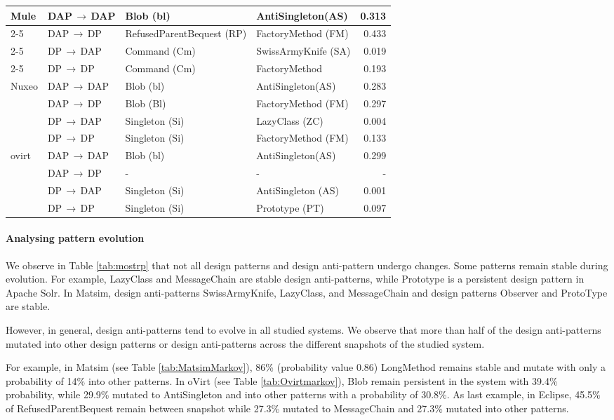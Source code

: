 \begin{table*}
{\begin{tabular}{|p{1.75cm}|l|l|l|r|}
\hline 
\multirow{4}{*}{Mule} & DAP$\,\to\,$DAP & Blob (bl) & AntiSingleton(AS) & 0.313\\
\cline{2-5}
 & DAP$\,\to\,$DP & RefusedParentBequest (RP) & FactoryMethod (FM) & 0.433\\
\cline{2-5}
 & DP$\,\to\,$DAP & Command (Cm) & SwissArmyKnife (SA) & 0.019\\
\cline{2-5}
 & DP$\,\to\,$DP & Command (Cm) & FactoryMethod & 0.193\\
\hline 
\multirow{4}{*}{Nuxeo} & DAP$\,\to\,$DAP & Blob (bl) & AntiSingleton(AS) & 0.283\\
\cline{2-5}
 & DAP$\,\to\,$DP & Blob (Bl) & FactoryMethod (FM) & 0.297\\
\cline{2-5}
 & DP$\,\to\,$DAP & Singleton (Si) & LazyClass (ZC) & 0.004\\
\cline{2-5}
 & DP$\,\to\,$DP & Singleton (Si) & FactoryMethod (FM) & 0.133\\
\hline 
\multirow{4}{*}{ovirt} & DAP$\,\to\,$DAP & Blob (bl) & AntiSingleton(AS) & 0.299\\
\cline{2-5}
 & DAP$\,\to\,$DP & - & - & -\\
\cline{2-5}
 & DP$\,\to\,$DAP & Singleton (Si) & AntiSingleton (AS) & 0.001\\
\cline{2-5}
 & DP$\,\to\,$DP & Singleton (Si) & Prototype (PT) & 0.097\\
\hline 
\end{tabular}
}
\label{tab:mostrp}
\end{table*} 

\paragraph{\textbf{Analysing pattern evolution}} We observe in Table \ref{tab:mostrp} that not all design patterns and design anti-pattern undergo changes. Some patterns remain stable during evolution. For example, LazyClass and MessageChain are stable design anti-patterns, while Prototype is a persistent design pattern in Apache Solr. In Matsim, design anti-patterns SwissArmyKnife, LazyClass, and MessageChain and design patterns Observer and ProtoType are stable.

However, in general, design anti-patterns tend to evolve in all studied systems. We observe that more than half of the design anti-patterns mutated into other design patterns or design anti-patterns across the different snapshots of the studied system. 

For example, in Matsim (see Table \ref{tab:MatsimMarkov}), 86\% (probability value 0.86) LongMethod remains stable and mutate with only a probability of 14\% into other patterns. In oVirt (see Table \ref{tab:Ovirtmarkov}), Blob remain persistent in the system with 39.4\% probability, while 29.9\% mutated to AntiSingleton and into other patterns with a probability of 30.8\%. As last example, in Eclipse, 45.5\% of RefusedParentBequest remain between snapshot while 27.3\% mutated to MessageChain and 27.3\% mutated into other patterns.

